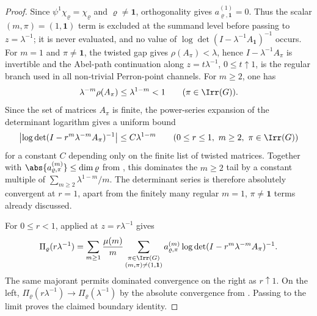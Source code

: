 \begin{proof}
  Since \(\psi^1\chi_\varrho=\chi_\varrho\) and
  \(\varrho\neq\mathbf 1\), orthogonality gives
  \(a_{\varrho,\mathbf 1}^{(1)}=0\). Thus the scalar
  \((m,\pi)=(1,\mathbf1)\) term is excluded at the summand level before
  passing to \(z=\lambda^{-1}\); it is never evaluated, and no value of
  \(\log\det(I-\lambda^{-1}A_{\mathbf 1})^{-1}\) occurs. For
  \(m=1\) and \(\pi\neq\mathbf 1\), the twisted gap gives
  \(\rho(A_\pi)<\lambda\), hence \(I-\lambda^{-1}A_\pi\) is
  invertible and the Abel-path continuation along
  \(z=t\lambda^{-1}\), \(0\le t\uparrow1\), is the regular branch used in
  all non-trivial Perron-point channels. For
  \(m\ge2\), one has
  \[
    \lambda^{-m}\rho(A_\pi)\le \lambda^{1-m}<1
    \qquad(\pi\in\Irr(G)).
  \]
  Since the set of matrices \(A_\pi\) is finite, the power-series
  expansion of the determinant logarithm gives a uniform bound
  \[
    \left|\log\det(I-r^m\lambda^{-m}A_\pi)^{-1}\right|
    \le C\lambda^{1-m}
    \qquad(0\le r\le1,\ m\ge2,\ \pi\in\Irr(G))
  \]
  for a constant \(C\) depending only on the finite list of twisted
  matrices. Together with
  \(\abs{a_{\varrho,\pi}^{(m)}}\le\dim\varrho\) from
  , this dominates the \(m\ge2\)
  tail by a constant multiple of
  \(\sum_{m\ge2}\lambda^{1-m}/m\). The determinant series is therefore
  absolutely convergent at \(r=1\), apart from the finitely many regular
  \(m=1\), \(\pi\neq\mathbf1\) terms already discussed.

  For \(0\le r<1\),  applied
  at \(z=r\lambda^{-1}\) gives
  \[
    \Pi_\varrho(r\lambda^{-1})
    =
    \sum_{m\ge 1}\frac{\mu(m)}{m}
      \sum_{\substack{\pi\in\Irr(G)\\(m,\pi)\neq(1,\mathbf 1)}}
        a_{\varrho,\pi}^{(m)}
        \log\det(I-r^m\lambda^{-m}A_\pi)^{-1}.
  \]
  The same majorant permits dominated convergence on the right as
  \(r\uparrow1\). On the left,
  \(\Pi_\varrho(r\lambda^{-1})\to\Pi_\varrho(\lambda^{-1})\) by the
  absolute convergence from
  . Passing to the limit
  proves the claimed boundary identity.
\end{proof}

